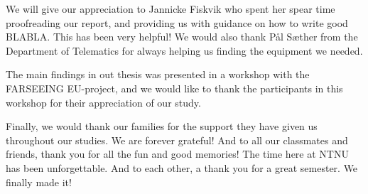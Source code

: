 \documentclass[b5paper,twoside,openright,11pt]{report}
\begin{document}
We will give our appreciation to Jannicke Fiskvik who spent her spear time proofreading our report, and providing us with guidance on how to write good BLABLA. This has been very helpful! We would also thank Pål Sæther from the Department of Telematics for always helping us finding the equipment we needed. 

The main findings in out thesis was presented in a workshop with the FARSEEING EU-project, and we would like to thank the participants in this workshop for their appreciation of our study. 

Finally, we would thank our families for the support they have given us throughout our studies. We are forever grateful! And to all our classmates and friends, thank you for all the fun and good memories! The time here at NTNU has been unforgettable. And to each other, a thank you for a great semester. We finally made it!   

\cleardoublepage
{}
\tableofcontents
\cleardoublepage

\cleardoublepage
\listoffigures
\cleardoublepage
\listoftables
\cleardoublepage
{}
\pagestyle{fancy}
\fancyhead[LE]{\thepage}
\fancyhead[RE]{\leftmark}
\fancyhead[RO]{\thepage}
\fancyhead[LO]{\rightmark}
\fancyfoot{}
\cleardoublepage

\cleardoublepage

\cleardoublepage

\cleardoublepage

\cleardoublepage

\cleardoublepage

\cleardoublepage

\cleardoublepage

\cleardoublepage

\cleardoublepage

\cleardoublepage

\cleardoublepage

\cleardoublepage

\cleardoublepage


\pagestyle{plain}
\cleardoublepage
\appendix 
  
\cleardoublepage
\end{document}
